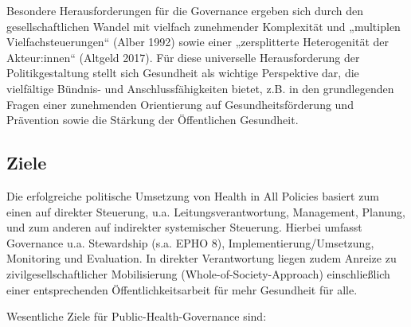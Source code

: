 \documentclass{article}
\begin{document}
Besondere Herausforderungen für die Governance ergeben sich durch den gesellschaftlichen Wandel mit vielfach zunehmender Komplexität und „multiplen Vielfachsteuerungen“ (Alber 1992) sowie einer „zersplitterte Heterogenität der Akteur:innen“ (Altgeld 2017). Für diese universelle Herausforderung der Politikgestaltung stellt sich Gesundheit als wichtige Perspektive dar, die vielfältige Bündnis- und Anschlussfähigkeiten bietet, z.B. in den grundlegenden Fragen einer zunehmenden Orientierung auf Gesundheitsförderung und Prävention sowie die Stärkung der Öffentlichen Gesundheit.


\subsection{Ziele }\label{H2315756}



Die erfolgreiche politische Umsetzung von Health in All Policies basiert zum einen auf direkter Steuerung, u.a. Leitungsverantwortung, Management, Planung, und zum anderen auf indirekter systemischer Steuerung. Hierbei umfasst Governance u.a. Stewardship (s.a. EPHO 8), Implementierung/Umsetzung, Monitoring und Evaluation. In direkter Verantwortung liegen zudem Anreize zu zivilgesellschaftlicher Mobilisierung (Whole-of-Society-Approach) einschließlich einer entsprechenden Öffentlichkeitsarbeit für mehr Gesundheit für alle. 


Wesentliche Ziele für Public-Health-Governance sind:
\end{document}
